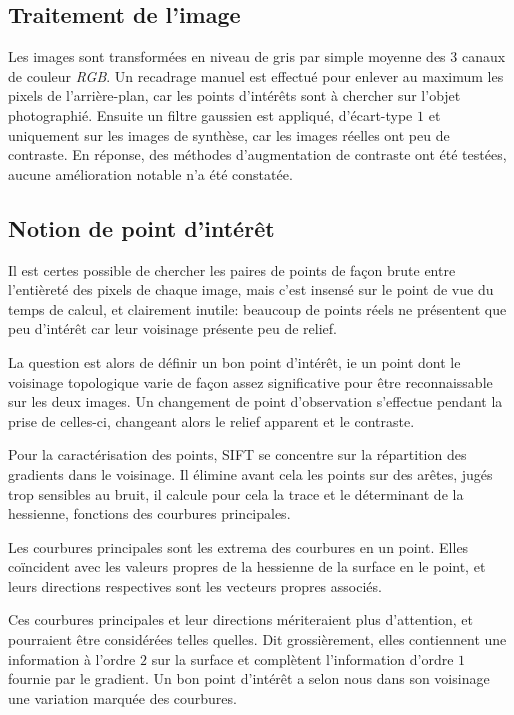 \documentclass[
	a4paper, %
	10pt, %
	unnumberedsections, %
	twoside, %
]{LTJournalArticle}
\begin{document}
\subsection{Traitement de l'image}
Les images sont transformées en niveau de gris par simple moyenne des $3$ canaux de couleur \textit{RGB}.
Un recadrage manuel est effectué pour enlever au maximum les pixels de l'arrière-plan, car les points
d'intérêts sont à chercher sur l'objet photographié. Ensuite un filtre gaussien est
appliqué, d'écart-type $1$ et uniquement sur les images de synthèse, car les images réelles
ont peu de contraste. En réponse, des méthodes d'augmentation
de contraste ont été testées, aucune amélioration notable n'a été constatée.

\subsection{Notion de point d'intérêt}

Il est certes possible de chercher les paires de points de façon brute entre
l'entièreté des pixels de chaque image, mais c'est insensé sur le
point de vue du temps de calcul, et clairement inutile: beaucoup de
points réels ne présentent que peu d'intérêt car leur voisinage présente
peu de relief.

La question est alors de définir un bon point
d'intérêt, ie un point dont le voisinage topologique varie de façon
assez significative pour être reconnaissable sur les deux images.
Un changement de point d'observation s'effectue pendant
la prise de celles-ci, changeant alors le relief apparent et le contraste.

Pour la caractérisation des points, SIFT se concentre sur la répartition des gradients
dans le voisinage. Il élimine avant cela les points sur des arêtes, jugés trop
sensibles au bruit, il calcule pour cela la trace et le déterminant
de la hessienne, fonctions des courbures principales.

Les courbures principales sont les extrema des courbures en un point.
Elles coïncident avec les valeurs propres de la hessienne de la surface en le point,
et leurs directions respectives sont les vecteurs propres associés.

Ces courbures principales et leur directions mériteraient plus d'attention,
et pourraient être considérées telles quelles. Dit grossièrement,
elles contiennent une information à l'ordre $2$ sur la surface et complètent
l'information d'ordre $1$ fournie par le gradient. Un bon
point d'intérêt a selon nous dans son voisinage une variation marquée des courbures.
\end{document}
